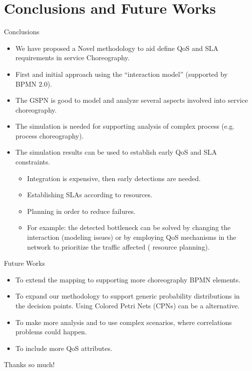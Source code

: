 \documentclass[xcolor=svgnames]{beamer}
\begin{document}
\section{Conclusions and Future Works}
   \begin{frame}{Conclusions}
       \begin{itemize}
         \item <1->  We have proposed a Novel methodology to aid define QoS and SLA requirements in service Choreography.
         \item <2-> First and initial approach using the ``interaction model'' (supported by BPMN $2.0$).
         \item <3-> The GSPN is good to model and analyze several aspects involved into service choreography. 
         \item <4-> The simulation is needed for supporting analysis of complex process (e.g. process choreography).   
     	 \item <5-> The simulation results can be used to establish early QoS and SLA constraints. 
            \begin{itemize}
              \item Integration is expensive, then early detections are needed.  
              \item Establishing SLAs according to resources. 
              \item Planning in order to reduce failures.
              \item For example: the detected bottleneck can be solved by changing the interaction (modeling issues) or by employing QoS mechanisms in the network to prioritize the traffic affected ( resource planning).
            \end{itemize}
       \end{itemize}
   \end{frame}


  \begin{frame}{Future Works}
       \begin{itemize}
         \item <1-> To extend the mapping to supporting more choreography BPMN elements.
    	 \item <2-> To expand our methodology to support generic probability distributions in the decision points. Using Colored Petri Nets (CPNs) can be a alternative.
         \item <3-> To make more analysis and to use complex scenarios, where correlations problems could happen.
         \item <4-> To include more QoS attributes.

       \end{itemize}
   \end{frame}





    \begin{frame}%
        \begin{block}{}\vspace{-.3\baselineskip}
        	Thanks so much!
        \end{block}

    \end{frame}
\end{document}
